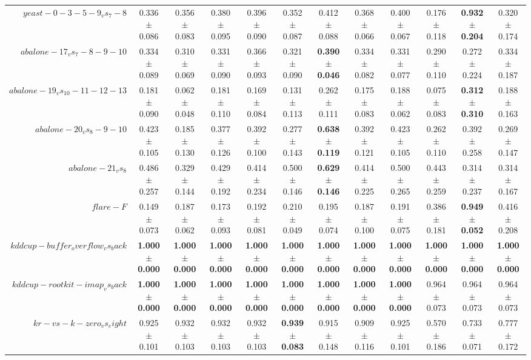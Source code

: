 \begin{table}[!ht]
{\begin{tabular}{r c c c c c c c c c c c}
$yeast-0-3-5-9_vs_7-8$ & 0.336 $\pm$ 0.086 & 0.356 $\pm$ 0.083 & 0.380 $\pm$ 0.095 & 0.396 $\pm$ 0.090 & 0.352 $\pm$ 0.087 & 0.412 $\pm$ 0.088 & 0.368 $\pm$ 0.066 & 0.400 $\pm$ 0.067 & 0.176 $\pm$ 0.118 & \textbf{0.932 $\pm$ 0.204} & 0.320 $\pm$ 0.174 \\
$abalone-17_vs_7-8-9-10$ & 0.334 $\pm$ 0.089 & 0.310 $\pm$ 0.069 & 0.331 $\pm$ 0.090 & 0.366 $\pm$ 0.093 & 0.321 $\pm$ 0.090 & \textbf{0.390 $\pm$ 0.046} & 0.334 $\pm$ 0.082 & 0.331 $\pm$ 0.077 & 0.290 $\pm$ 0.110 & 0.272 $\pm$ 0.224 & 0.334 $\pm$ 0.187 \\
$abalone-19_vs_10-11-12-13$ & 0.181 $\pm$ 0.090 & 0.062 $\pm$ 0.048 & 0.181 $\pm$ 0.110 & 0.169 $\pm$ 0.084 & 0.131 $\pm$ 0.113 & 0.262 $\pm$ 0.111 & 0.175 $\pm$ 0.083 & 0.188 $\pm$ 0.062 & 0.075 $\pm$ 0.083 & \textbf{0.312 $\pm$ 0.310} & 0.188 $\pm$ 0.163 \\
$abalone-20_vs_8-9-10$ & 0.423 $\pm$ 0.105 & 0.185 $\pm$ 0.130 & 0.377 $\pm$ 0.126 & 0.392 $\pm$ 0.100 & 0.277 $\pm$ 0.143 & \textbf{0.638 $\pm$ 0.119} & 0.392 $\pm$ 0.121 & 0.423 $\pm$ 0.105 & 0.262 $\pm$ 0.110 & 0.392 $\pm$ 0.258 & 0.269 $\pm$ 0.147 \\
$abalone-21_vs_8$ & 0.486 $\pm$ 0.257 & 0.329 $\pm$ 0.144 & 0.429 $\pm$ 0.192 & 0.414 $\pm$ 0.234 & 0.500 $\pm$ 0.146 & \textbf{0.629 $\pm$ 0.146} & 0.414 $\pm$ 0.225 & 0.500 $\pm$ 0.265 & 0.443 $\pm$ 0.259 & 0.314 $\pm$ 0.237 & 0.314 $\pm$ 0.167 \\
$flare-F$ & 0.149 $\pm$ 0.073 & 0.187 $\pm$ 0.062 & 0.173 $\pm$ 0.093 & 0.192 $\pm$ 0.081 & 0.210 $\pm$ 0.049 & 0.195 $\pm$ 0.074 & 0.187 $\pm$ 0.100 & 0.191 $\pm$ 0.075 & 0.386 $\pm$ 0.181 & \textbf{0.949 $\pm$ 0.052} & 0.416 $\pm$ 0.208 \\
$kddcup-buffer_overflow_vs_back$ & \textbf{1.000 $\pm$ 0.000} & \textbf{1.000 $\pm$ 0.000} & \textbf{1.000 $\pm$ 0.000} & \textbf{1.000 $\pm$ 0.000} & \textbf{1.000 $\pm$ 0.000} & \textbf{1.000 $\pm$ 0.000} & \textbf{1.000 $\pm$ 0.000} & \textbf{1.000 $\pm$ 0.000} & \textbf{1.000 $\pm$ 0.000} & \textbf{1.000 $\pm$ 0.000} & \textbf{1.000 $\pm$ 0.000} \\
$kddcup-rootkit-imap_vs_back$ & \textbf{1.000 $\pm$ 0.000} & \textbf{1.000 $\pm$ 0.000} & \textbf{1.000 $\pm$ 0.000} & \textbf{1.000 $\pm$ 0.000} & \textbf{1.000 $\pm$ 0.000} & \textbf{1.000 $\pm$ 0.000} & \textbf{1.000 $\pm$ 0.000} & \textbf{1.000 $\pm$ 0.000} & 0.964 $\pm$ 0.073 & 0.964 $\pm$ 0.073 & 0.964 $\pm$ 0.073 \\
$kr-vs-k-zero_vs_eight$ & 0.925 $\pm$ 0.101 & 0.932 $\pm$ 0.103 & 0.932 $\pm$ 0.103 & 0.932 $\pm$ 0.103 & \textbf{0.939 $\pm$ 0.083} & 0.915 $\pm$ 0.148 & 0.909 $\pm$ 0.116 & 0.925 $\pm$ 0.101 & 0.570 $\pm$ 0.186 & 0.733 $\pm$ 0.071 & 0.777 $\pm$ 0.172 \\

\end{tabular}}
\end{table}
